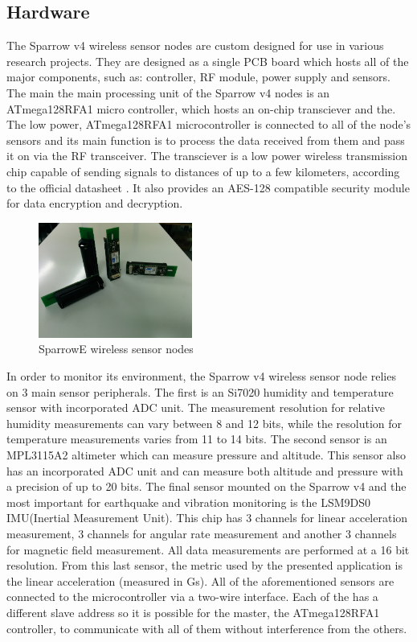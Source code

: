 \subsection{Hardware}

The Sparrow v4 wireless sensor nodes are custom designed for use in various research projects.
They are designed as a single PCB board which hosts all of the major components, such as: controller,
RF module, power supply and sensors. The main the main processing unit of the Sparrow v4 nodes is an ATmega128RFA1 micro controller, 
which hosts an on-chip transciever \cite{ATmega1281} and the. The low power, ATmega128RFA1 microcontroller is connected to all of the node's sensors and its
main function is to process the data received from them and pass it on via the RF transceiver. The transciever 
is a low power wireless transmission chip capable of sending signals to distances of up to a few kilometers, according 
to the official datasheet \cite{datasheetatmel}. It also provides an AES-128 compatible security module for data 
encryption and decryption.

\begin{figure}[ht] \centering
  \includegraphics[width=0.45\textwidth]{img/sparrow-nodes.jpg}
  \caption{SparrowE wireless sensor nodes}
\end{figure}

In order to monitor its environment, the Sparrow v4 wireless sensor node relies on 3 main sensor peripherals. The first is 
an Si7020 humidity and temperature sensor\cite{Si7020} with incorporated ADC unit. The measurement resolution for relative humidity measurements
can vary between 8 and 12 bits, while the resolution for temperature measurements varies from 11 to 14 bits. The second sensor is 
an MPL3115A2 \cite{MPL3115A2} altimeter which can measure pressure and altitude. This sensor also has an incorporated ADC unit and can measure 
both altitude and pressure with a precision of up to 20 bits. The final sensor mounted on the Sparrow v4 and the most important for 
earthquake and vibration monitoring is the LSM9DS0 IMU(Inertial Measurement Unit)\cite{LSM9DS0}. This chip has 3 channels for linear acceleration measurement, 
3 channels for angular rate measurement and another 3 channels for magnetic field measurement. All data measurements are performed at a 
16 bit resolution. From this last sensor, the metric used by the presented application is the linear acceleration (measured in Gs).
All of the aforementioned sensors are connected to the microcontroller via a two-wire interface. Each of the has a different slave address so 
it is possible for the master, the ATmega128RFA1 controller, to communicate with all of them without interference from the others.

